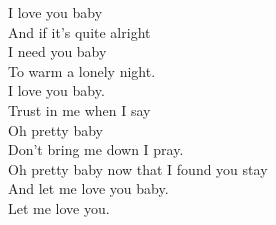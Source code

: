 I love you baby \\
And if it's quite alright \\
I need you baby \\
To warm a lonely night. \\
I love you baby.\\
Trust in me when I say \\

Oh pretty baby\\
Don't bring me down I pray.\\
Oh pretty baby now that I found you stay \\
And let me love you baby.\\
Let me love you.\\
